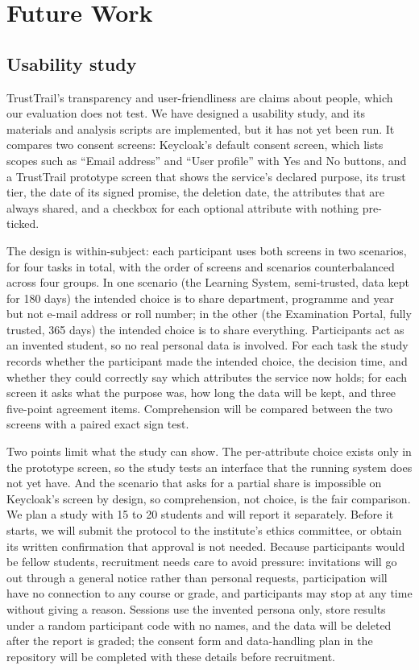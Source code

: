 \section{Future Work}
\label{sec:future}

\subsection{Usability study}
TrustTrail's transparency and user-friendliness are claims about people, which our evaluation does not test. We have designed a usability study, and its materials and analysis scripts are implemented, but it has not yet been run. It compares two consent screens: Keycloak's default consent screen, which lists scopes such as ``Email address'' and ``User profile'' with Yes and No buttons, and a TrustTrail prototype screen that shows the service's declared purpose, its trust tier, the date of its signed promise, the deletion date, the attributes that are always shared, and a checkbox for each optional attribute with nothing pre-ticked.

The design is within-subject: each participant uses both screens in two scenarios, for four tasks in total, with the order of screens and scenarios counterbalanced across four groups. In one scenario (the Learning System, semi-trusted, data kept for 180 days) the intended choice is to share department, programme and year but not e-mail address or roll number; in the other (the Examination Portal, fully trusted, 365 days) the intended choice is to share everything. Participants act as an invented student, so no real personal data is involved. For each task the study records whether the participant made the intended choice, the decision time, and whether they could correctly say which attributes the service now holds; for each screen it asks what the purpose was, how long the data will be kept, and three five-point agreement items. Comprehension will be compared between the two screens with a paired exact sign test.

Two points limit what the study can show. The per-attribute choice exists only in the prototype screen, so the study tests an interface that the running system does not yet have. And the scenario that asks for a partial share is impossible on Keycloak's screen by design, so comprehension, not choice, is the fair comparison. We plan a study with 15 to 20 students and will report it separately. Before it starts, we will submit the protocol to the institute's ethics committee, or obtain its written confirmation that approval is not needed. Because participants would be fellow students, recruitment needs care to avoid pressure: invitations will go out through a general notice rather than personal requests, participation will have no connection to any course or grade, and participants may stop at any time without giving a reason. Sessions use the invented persona only, store results under a random participant code with no names, and the data will be deleted after the report is graded; the consent form and data-handling plan in the repository will be completed with these details before recruitment.


